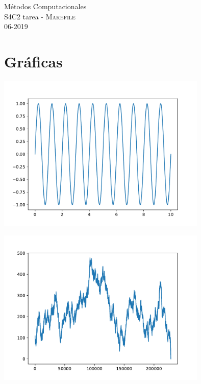 \documentclass[11pt,letterpaper]{exam}
\begin{document}
\begin{center}
{\Large Métodos Computacionales} \\
S4C2 tarea - \textsc{Makefile}\\
06-2019\\
\end{center}


\noindent
\section{Gr\'aficas}
\begin{center}
\includegraphics[width=10cm]{plot.pdf} 
\begin{center}
\end{center}
\includegraphics[width=10cm]{plot1.pdf} 
\end{center}
\end{document}
